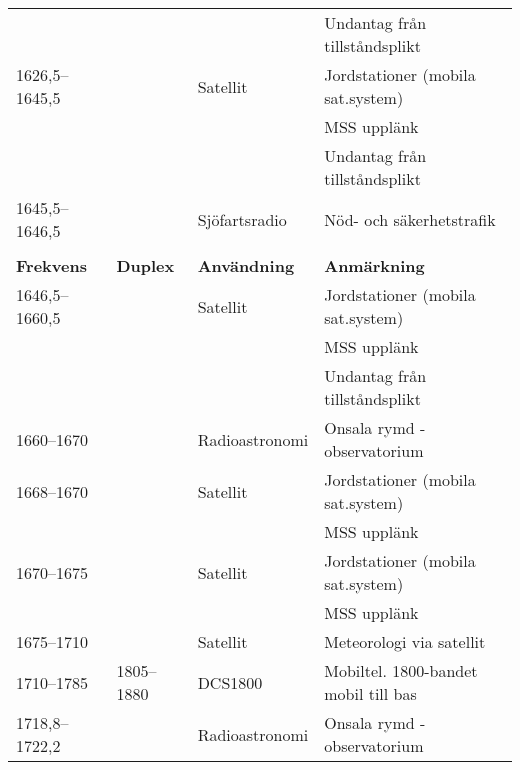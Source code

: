 \begin{landscape}
\begin{longtable}{llll}
	                   &                    &                         & Undantag från tillståndsplikt            \\
	1626,5--1645,5     &                    & Satellit                & Jordstationer (mobila sat.system)        \\
	                   &                    &                         & MSS upplänk                              \\
	                   &                    &                         & Undantag från tillståndsplikt            \\
	1645,5--1646,5     &                    & Sjöfartsradio           & Nöd- och säkerhetstrafik                 \\
	                   &                    &                         &  \\
	\textbf{Frekvens}  & \textbf{Duplex}    & \textbf{Användning}     & \textbf{Anmärkning}                      \\ \hline
	1646,5--1660,5     &                    & Satellit                & Jordstationer (mobila sat.system)        \\
	                   &                    &                         & MSS upplänk                              \\
	                   &                    &                         & Undantag från tillståndsplikt            \\
	1660--1670         &                    & Radioastronomi          & Onsala rymd - observatorium              \\
	1668--1670         &                    & Satellit                & Jordstationer (mobila sat.system)        \\
	                   &                    &                         & MSS upplänk                              \\
	1670--1675         &                    & Satellit                & Jordstationer (mobila sat.system)        \\
	                   &                    &                         & MSS upplänk                              \\
	1675--1710         &                    & Satellit                & Meteorologi via satellit                 \\
	1710--1785         & 1805--1880         & DCS1800                 & Mobiltel. 1800-bandet mobil till bas     \\
	1718,8--1722,2     &                    & Radioastronomi          & Onsala rymd - observatorium              \\

\end{longtable}
\end{landscape}
